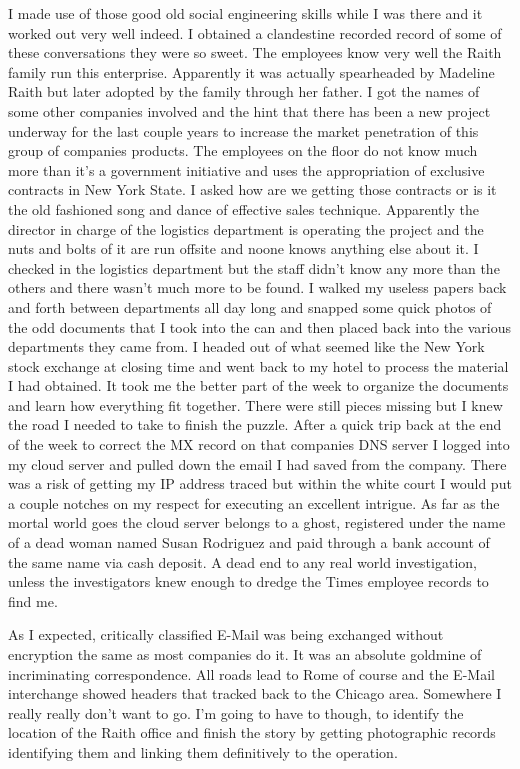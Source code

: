 I made use of those good old social engineering skills while I was there and it worked out very well indeed. I obtained a clandestine recorded record of some of these conversations they were so sweet. The employees know very well the Raith family run this enterprise. Apparently it was actually spearheaded by Madeline Raith but later adopted by the family through her father. I got the names of some other companies involved and the hint that there has been a new project underway for the last couple years to increase the market penetration of this group of companies products. The employees on the floor do not know much more than it's a government initiative and uses the appropriation of exclusive contracts in New York State. I asked how are we getting those contracts or is it the old fashioned song and dance of effective sales technique. Apparently the director in charge of the logistics department is operating the project and the nuts and bolts of it are run offsite and noone knows anything else about it. I checked in the logistics department but the staff didn't know any more than the others and there wasn't much more to be found. I walked my useless papers back and forth between departments all day long and snapped some quick photos of the odd documents that I took into the can and then placed back into the various departments they came from. I headed out of what seemed like the New York stock exchange at closing time and went back to my hotel to process the material I had obtained. It took me the better part of the week to organize the documents and learn how everything fit together. There were still pieces missing but I knew the road I needed to take to finish the puzzle. After a quick trip back at the end of the week to correct the MX record on that companies DNS server I logged into my cloud server and pulled down the email I had saved from the company. There was a risk of getting my IP address traced but within the white court I would put a couple notches on my respect for executing an excellent intrigue. As far as the mortal world goes the cloud server belongs to a ghost, registered under the name of a dead woman named Susan Rodriguez and paid through a bank account of the same name via cash deposit. A dead end to any real world investigation, unless the investigators knew enough to dredge the Times employee records to find me.

As I expected, critically classified E-Mail was being exchanged without encryption the same as most companies do it. It was an absolute goldmine of incriminating correspondence. All roads lead to Rome of course and the E-Mail interchange showed headers that tracked back to the Chicago area. Somewhere I really really don't want to go. I'm going to have to though, to identify the location of the Raith office and finish the story by getting photographic records identifying them and linking them definitively to the operation.

